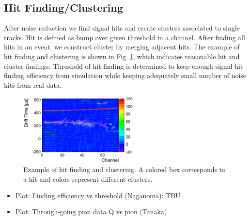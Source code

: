 \subsection{Hit Finding/Clustering}
After noise reduction we find signal hits and create clusters associated to single tracks. 
Hit is defined as bump over given threshold in a channel. 
After finding all hits in an event, we construct cluster by merging adjacent hits. 
The example of hit finding and clustering is shown in Fig~\ref{fig:Clustering}, which indicates reasonable hit and cluster findings. 
Threshold of hit finding is determined to keep enough signal hit finding efficiency from simulation while keeping adequately small number of noise hits from real data.

\begin{figure}[htbp]
 \begin{center}
  \includegraphics[width=60mm]{fig/clustering.eps}
 \end{center}
 \caption{Example of hit finding and clustering. A colored box corresponds to a hit and colors represent different clusters.}
 \label{fig:Clustering}
\end{figure}

\begin{itemize}
\item Plot: Finding efficiency vs threshold (Naganoma): TBU
\item Plot: Through-going pion data Q vs pion (Tanaka)
\end{itemize}
